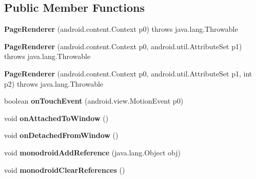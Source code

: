 \subsection*{Public Member Functions}
\begin{DoxyCompactItemize}
\item 
\hypertarget{classmd5282f1122c1313907b9bf274dd2c2f344_1_1PageRenderer_aec5ee8c4683a2bb09d9c4a3fdb806167}{}{\bfseries Page\+Renderer} (android.\+content.\+Context p0)  throws java.\+lang.\+Throwable 	\label{classmd5282f1122c1313907b9bf274dd2c2f344_1_1PageRenderer_aec5ee8c4683a2bb09d9c4a3fdb806167}

\item 
\hypertarget{classmd5282f1122c1313907b9bf274dd2c2f344_1_1PageRenderer_ac6fa081b286aba816c461ec26a582fbe}{}{\bfseries Page\+Renderer} (android.\+content.\+Context p0, android.\+util.\+Attribute\+Set p1)  throws java.\+lang.\+Throwable 	\label{classmd5282f1122c1313907b9bf274dd2c2f344_1_1PageRenderer_ac6fa081b286aba816c461ec26a582fbe}

\item 
\hypertarget{classmd5282f1122c1313907b9bf274dd2c2f344_1_1PageRenderer_a40941b5446da1683e63461047edc3cee}{}{\bfseries Page\+Renderer} (android.\+content.\+Context p0, android.\+util.\+Attribute\+Set p1, int p2)  throws java.\+lang.\+Throwable 	\label{classmd5282f1122c1313907b9bf274dd2c2f344_1_1PageRenderer_a40941b5446da1683e63461047edc3cee}

\item 
\hypertarget{classmd5282f1122c1313907b9bf274dd2c2f344_1_1PageRenderer_ad32cd83695ea8347773b68168dd9744a}{}boolean {\bfseries on\+Touch\+Event} (android.\+view.\+Motion\+Event p0)\label{classmd5282f1122c1313907b9bf274dd2c2f344_1_1PageRenderer_ad32cd83695ea8347773b68168dd9744a}

\item 
\hypertarget{classmd5282f1122c1313907b9bf274dd2c2f344_1_1PageRenderer_ad2abb8a26a0ce10dfc46d04d79dcbbe7}{}void {\bfseries on\+Attached\+To\+Window} ()\label{classmd5282f1122c1313907b9bf274dd2c2f344_1_1PageRenderer_ad2abb8a26a0ce10dfc46d04d79dcbbe7}

\item 
\hypertarget{classmd5282f1122c1313907b9bf274dd2c2f344_1_1PageRenderer_ad1f74bfb6a7131b1db74b1811ec2289f}{}void {\bfseries on\+Detached\+From\+Window} ()\label{classmd5282f1122c1313907b9bf274dd2c2f344_1_1PageRenderer_ad1f74bfb6a7131b1db74b1811ec2289f}

\item 
\hypertarget{classmd5282f1122c1313907b9bf274dd2c2f344_1_1PageRenderer_a4a6c81d28d822b0b3a880714e1b5a0cb}{}void {\bfseries monodroid\+Add\+Reference} (java.\+lang.\+Object obj)\label{classmd5282f1122c1313907b9bf274dd2c2f344_1_1PageRenderer_a4a6c81d28d822b0b3a880714e1b5a0cb}

\item 
\hypertarget{classmd5282f1122c1313907b9bf274dd2c2f344_1_1PageRenderer_a5894c999d3f5edaa9487a789e0c9a071}{}void {\bfseries monodroid\+Clear\+References} ()\label{classmd5282f1122c1313907b9bf274dd2c2f344_1_1PageRenderer_a5894c999d3f5edaa9487a789e0c9a071}

\end{DoxyCompactItemize}


